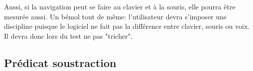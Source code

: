 \documentclass[a4paper, 11pt]{report}
\begin{document}
		
		
	
	
	
	
	
	
	
	
	
	
	
	
	
	Aussi, si la navigation peut se faire au clavier et à la souris, elle pourra \^etre mesurée aussi. Un bémol tout de m\^eme: l'utilisateur devra s'imposer une discipline puisque le logiciel ne fait pas la différence entre clavier, souris ou voix. Il devra donc lors du test ne pas "tricher".
	
	
	
	
	
	
		
	\newpage	
		
	\tableofcontents

\begin{appendices}

    \chapter{Prédicat soustraction}



\end{appendices} 




		
\end{document}
